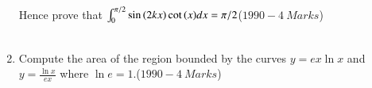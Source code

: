 \documentclass[journal]{IEEEtran}
\begin{document}
\begin{enumerate}
\begin{align*}
				 \end{align*}
					 \\\\Hence prove that $\int_{0}^{\pi/2}\sin{\ensuremath{\left(2kx\right)}}\cot{\ensuremath{\left(x\right)}}dx=\pi/2$\hfill($1990-4\ Marks$)\\\\
				 \item Compute the area of the region bounded by the curves $y=ex\ln{x}$ and $y=\frac{\ln{x}}{ex}$ where $\ln{e}=1$.\hfill($1990-4\ Marks$)\\\\
			 \end{enumerate}
			 
\end{document}
